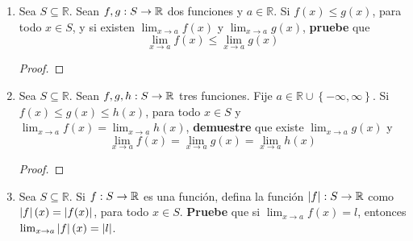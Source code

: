 \documentclass[12pt]{article}
\begin{document}
\begin{enumerate}
    \begin{proof}
    \end{proof}

    \item Sea $S\subseteq\mathbb{R}$. Sean $f,g:S\rightarrow\mathbb{R}$ dos funciones y $a\in\mathbb{R}$. Si $f(x)\leq g(x)$, para todo $x\in S$, y si existen $\lim_{ x\rightarrow a}f(x)$ y $\lim_{ x\rightarrow a}g(x)$, \textbf{pruebe} que
    \begin{equation*}
        \lim_{ x\rightarrow a}f(x)\leq\lim_{ x\rightarrow a}g(x)
    \end{equation*}

    \begin{proof}
    \end{proof}

    \item Sea $S\subseteq\mathbb{R}$. Sean $f,g,h:S\rightarrow\mathbb{R}$ tres funciones. Fije $a\in\mathbb{R}\cup\left\{-\infty,\infty \right\}$. Si $f(x)\leq g(x)\leq h(x)$, para todo $x\in S$ y $\lim_{ x\rightarrow a}f(x)=\lim_{ x\rightarrow a}h(x)$, \textbf{demuestre} que existe $\lim_{ x\rightarrow a}g(x)$ y
    \begin{equation*}
        \lim_{ x\rightarrow a}f(x)=\lim_{ x\rightarrow a}g(x)=\lim_{ x\rightarrow a}h(x)
    \end{equation*}

    \begin{proof}
    \end{proof}

    \item Sea $S\subseteq\mathbb{R}$. Si $f:S\rightarrow\mathbb{R}$ es una función, defina la función $\left| f \right|:S\rightarrow\mathbb{R}$ como $\left| f \right|(x)=\left| f(x) \right|$, para todo $x\in S$. \textbf{Pruebe} que si $\lim_{ x\rightarrow a}f(x)=l$, entonces $\lim_{ x\rightarrow a}\left| f \right|(x)=\left| l \right|$.
    

\end{enumerate}
\end{document}
